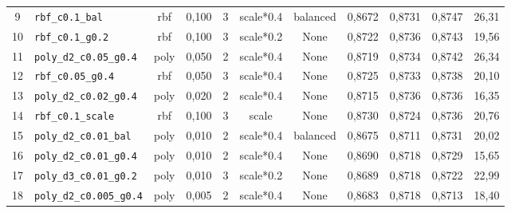 \begin{table}[H]
{\begin{tabular}{@{}clccccccccc@{}}
            9             & \texttt{rbf\_c0.1\_bal}         & rbf             & 0,100      & 3            & scale*0.4      & balanced              & 0,8672              & 0,8731          & 0,8747            & 26,31                 \\
            10            & \texttt{rbf\_c0.1\_g0.2}        & rbf             & 0,100      & 3            & scale*0.2      & None                  & 0,8722              & 0,8736          & 0,8743            & 19,56                 \\
            11            & \texttt{poly\_d2\_c0.05\_g0.4}  & poly            & 0,050      & 2            & scale*0.4      & None                  & 0,8719              & 0,8734          & 0,8742            & 26,34                 \\
            12            & \texttt{rbf\_c0.05\_g0.4}       & rbf             & 0,050      & 3            & scale*0.4      & None                  & 0,8725              & 0,8733          & 0,8738            & 20,10                 \\
            13            & \texttt{poly\_d2\_c0.02\_g0.4}  & poly            & 0,020      & 2            & scale*0.4      & None                  & 0,8715              & 0,8736          & 0,8736            & 16,35                 \\
            14            & \texttt{rbf\_c0.1\_scale}       & rbf             & 0,100      & 3            & scale          & None                  & 0,8730              & 0,8724          & 0,8736            & 20,76                 \\
            15            & \texttt{poly\_d2\_c0.01\_bal}   & poly            & 0,010      & 2            & scale*0.4      & balanced              & 0,8675              & 0,8711          & 0,8731            & 20,02                 \\
            16            & \texttt{poly\_d2\_c0.01\_g0.4}  & poly            & 0,010      & 2            & scale*0.4      & None                  & 0,8690              & 0,8718          & 0,8729            & 15,65                 \\
            17            & \texttt{poly\_d3\_c0.01\_g0.2}  & poly            & 0,010      & 3            & scale*0.2      & None                  & 0,8689              & 0,8718          & 0,8722            & 22,99                 \\
            18            & \texttt{poly\_d2\_c0.005\_g0.4} & poly            & 0,005      & 2            & scale*0.4      & None                  & 0,8683              & 0,8718          & 0,8713            & 18,40                 \\
            \bottomrule
        \end{tabular}%
    }
\end{table}

